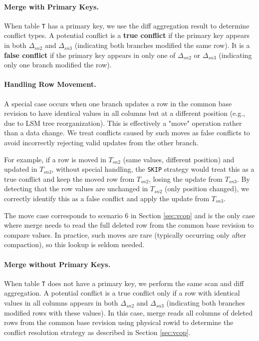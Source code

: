 \documentclass[sigconf,nonacm]{acmart} %
\begin{document}
\paragraph{Merge with Primary Keys.}
When table \texttt{T} has a primary key, we use the diff aggregation result to 
determine conflict types. A potential conflict is a \textbf{true conflict} if the 
primary key appears in both $\Delta_{sn2}$ and $\Delta_{sn3}$ (indicating both 
branches modified the same row). It is a \textbf{false conflict} if the primary key 
appears in only one of $\Delta_{sn2}$ or $\Delta_{sn3}$ (indicating only one branch 
modified the row).

\paragraph{Handling Row Movement.}
A special case occurs when one branch updates a row in the common base revision to 
have identical values in all columns but at a different position (e.g., due to 
LSM tree reorganization). This is effectively a "move" operation rather than a 
data change. We treat conflicts caused by such moves as false conflicts to avoid 
incorrectly rejecting valid updates from the other branch.

For example, if a row is moved in $T_{sn2}$ (same values, different position) and 
updated in $T_{sn3}$, without special handling, the \texttt{SKIP} strategy would 
treat this as a true conflict and keep the moved row from $T_{sn2}$, losing the 
update from $T_{sn3}$. By detecting that the row values are unchanged in $T_{sn2}$ 
(only position changed), we correctly identify this as a false conflict and apply 
the update from $T_{sn3}$.

The move case corresponds to scenario 6 in Section \ref{sec:vcop} and is the only 
case where merge needs to read the full deleted row from the common base revision 
to compare values. In practice, such moves are rare (typically occurring only after 
compaction), so this lookup is seldom needed.

\paragraph{Merge without Primary Keys.}
When table \texttt{T} does not have a primary key, we perform the same scan and 
diff aggregation. A potential conflict is a true conflict only if a row with identical 
values in all columns appears in both $\Delta_{sn2}$ and $\Delta_{sn3}$ (indicating 
both branches modified rows with these values). In this case, merge reads all columns 
of deleted rows from the common base revision using physical rowid to determine the 
conflict resolution strategy as described in Section \ref{sec:vcop}.
\end{document}
